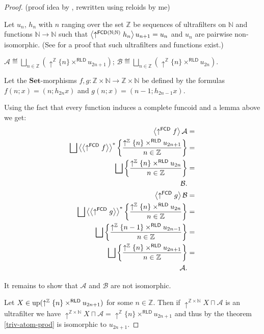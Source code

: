 \begin{proof}
(proof idea by , rewritten using reloids by me)

Let $u_{n}$, $h_{n}$ with $n$ ranging over the set $\mathbb{Z}$
be sequences of ultrafilters on $\mathbb{N}$ and functions $\mathbb{N}\rightarrow\mathbb{N}$
such that $\left\langle \uparrow^{\mathsf{FCD}(\mathbb{N};\mathbb{N})}h_{n}\right\rangle u_{n+1}=u_{n}$
and $u_{n}$ are pairwise non-isomorphic. (See \cite{kleene-degrees}
for a proof that such ultrafilters and functions exist.)

$\mathcal{A}\eqdef\bigsqcup_{n\in\mathbb{Z}}(\uparrow^{\mathbb{Z}}\{n\}\times^{\mathsf{RLD}} u_{2n+1})$;
$\mathcal{B}\eqdef\bigsqcup_{n\in\mathbb{Z}}(\uparrow^{\mathbb{Z}}\{n\}\times^{\mathsf{RLD}} u_{2n})$.

Let the $\mathbf{Set}$-morphisms $f,g:\mathbb{Z}\times\mathbb{N}\rightarrow\mathbb{Z}\times\mathbb{N}$
be defined by the formulas $f(n;x)=(n;h_{2n}x)$ and $g(n;x)=(n-1;h_{2n-1}x)$.

Using the fact that every function induces a complete funcoid and
a lemma above we get:
\begin{align*}
\supfun{\uparrow^{\mathsf{FCD}}f}\mathcal{A} & =\\
\bigsqcup\rsupfun{\supfun{\uparrow^{\mathsf{FCD}}f}}\setcond{\uparrow^{\mathbb{Z}}\{n\}\times^{\mathsf{RLD}} u_{2n+1}}{n\in\mathbb{Z}} & =\\
\bigsqcup\setcond{\uparrow^{\mathbb{Z}}\{n\}\times^{\mathsf{RLD}} u_{2n}}{n\in\mathbb{Z}} & =\\
\mathcal{B}.\\
\supfun{\uparrow^{\mathsf{FCD}}g}\mathcal{B} & =\\
\bigsqcup\rsupfun{\supfun{\uparrow^{\mathsf{FCD}}g}}\setcond{\uparrow^{\mathbb{Z}}\{n\}\times^{\mathsf{RLD}} u_{2n}}{n\in\mathbb{Z}} & =\\
\bigsqcup\setcond{\uparrow^{\mathbb{Z}}\{n-1\}\times^{\mathsf{RLD}} u_{2n-1}}{n\in\mathbb{Z}} & =\\
\bigsqcup\setcond{\uparrow^{\mathbb{Z}}\{n\}\times^{\mathsf{RLD}} u_{2n+1}}{n\in\mathbb{Z}} & =\\
\mathcal{A}.
\end{align*}


It remains to show that $\mathcal{A}$ and $\mathcal{B}$ are not
isomorphic.

Let $X\in\operatorname{up}(\uparrow^{\mathbb{Z}}\{n\}\times^{\mathsf{RLD}}u_{2n+1})$
for some $n\in\mathbb{Z}$. Then if $\uparrow^{\mathbb{Z}\times\mathbb{N}}X\sqcap\mathcal{A}$
is an ultrafilter we have $\uparrow^{\mathbb{Z}\times\mathbb{N}}X\sqcap\mathcal{A}=\uparrow^{\mathbb{Z}}\{n\}\times^{\mathsf{RLD}}u_{2n+1}$
and thus by the theorem \ref{triv-atom-prod} is isomorphic to $u_{2n+1}$.


\end{proof}
